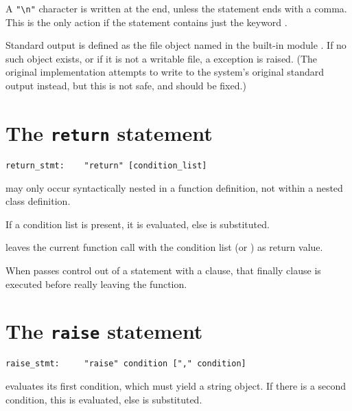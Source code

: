 A \verb/"\n"/ character is written at the end, unless the \verb@print@
statement ends with a comma.  This is the only action if the statement
contains just the keyword \verb@print@.

Standard output is defined as the file object named \verb@stdout@
in the built-in module \verb@sys@.  If no such object exists,
or if it is not a writable file, a \verb@RuntimeError@ exception is raised.
(The original implementation attempts to write to the system's original
standard output instead, but this is not safe, and should be fixed.)

\section{The {\tt return} statement}

\begin{verbatim}
return_stmt:    "return" [condition_list]
\end{verbatim}

\verb@return@ may only occur syntactically nested in a function
definition, not within a nested class definition.

If a condition list is present, it is evaluated, else \verb@None@
is substituted.

\verb@return@ leaves the current function call with the condition
list (or \verb@None@) as return value.

When \verb@return@ passes control out of a \verb@try@ statement
with a \verb@finally@ clause, that finally clause is executed
before really leaving the function.

\section{The {\tt raise} statement}

\begin{verbatim}
raise_stmt:     "raise" condition ["," condition]
\end{verbatim}

\verb@raise@ evaluates its first condition, which must yield
a string object.  If there is a second condition, this is evaluated,
else \verb@None@ is substituted.

